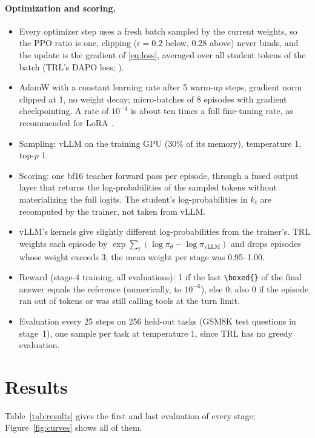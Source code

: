 \documentclass[11pt,a4paper]{article}
\newcommand{\pis}{\pi_\theta}
\begin{document}
\paragraph{Optimization and scoring.}
\begin{itemize}[leftmargin=*,itemsep=1pt,topsep=2pt]
\item Every optimizer step uses a fresh batch sampled by the current
  weights, so the PPO ratio is one, clipping ($\epsilon=0.2$ below, 0.28
  above) never binds, and the update is the gradient of \eqref{eq:loss},
  averaged over all student tokens of the batch (TRL's DAPO loss;
  \citealp{yu2025dapo}).
\item AdamW with a constant learning rate after 5 warm-up steps, gradient
  norm clipped at 1, no weight decay; micro-batches of 8 episodes with
  gradient checkpointing. A rate of $10^{-4}$ is about ten times a full
  fine-tuning rate, as recommended for LoRA \citep{schulman2025lora}.
\item Sampling: vLLM on the training GPU (30\% of its memory), temperature
  1, top-$p$ 1.
\item Scoring: one bf16 teacher forward pass per episode, through a fused
  output layer that returns the log-probabilities of the sampled tokens
  without materializing the full logits. The student's log-probabilities in
  $k_t$ are recomputed by the trainer, not taken from vLLM.
\item vLLM's kernels give slightly different log-probabilities from the
  trainer's. TRL weights each episode by
  $\exp\sum_t(\log\pis-\log\pi_{\text{vLLM}})$ and drops episodes whose
  weight exceeds 3; the mean weight per stage was 0.95--1.00.
\item Reward (stage-4 training, all evaluations): 1 if the last
  \verb|\boxed{}| of the final answer equals the reference (numerically, to
  $10^{-6}$), else 0; also 0 if the episode ran out of tokens or was still
  calling tools at the turn limit.
\item Evaluation every 25 steps on 256 held-out tasks (GSM8K test questions
  in stage~1), one sample per task at temperature 1, since TRL has no greedy
  evaluation.
\end{itemize}

\section{Results}
\label{sec:results}

Table~\ref{tab:results} gives the first and last evaluation of every stage;
Figure~\ref{fig:curves} shows all of them.
\end{document}
